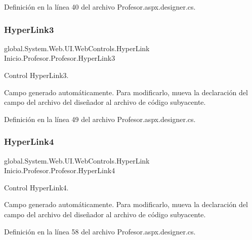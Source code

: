 Definición en la línea 40 del archivo Profesor.\+aspx.\+designer.\+cs.

\mbox{\label{classInicio_1_1Profesor_1_1Profesor_a741df29afdde160d779387af3d361b8f}} 
\subsubsection{\texorpdfstring{HyperLink3}{HyperLink3}}
{\footnotesize\ttfamily global.\+System.\+Web.\+U\+I.\+Web\+Controls.\+Hyper\+Link Inicio.\+Profesor.\+Profesor.\+Hyper\+Link3\hspace{0.3cm}{\ttfamily [protected]}}



Control Hyper\+Link3. 

Campo generado automáticamente. Para modificarlo, mueva la declaración del campo del archivo del diseñador al archivo de código subyacente. 

Definición en la línea 49 del archivo Profesor.\+aspx.\+designer.\+cs.

\mbox{\label{classInicio_1_1Profesor_1_1Profesor_a41defc3c5d27fcb0e5b001b0ff781fe3}} 
\subsubsection{\texorpdfstring{HyperLink4}{HyperLink4}}
{\footnotesize\ttfamily global.\+System.\+Web.\+U\+I.\+Web\+Controls.\+Hyper\+Link Inicio.\+Profesor.\+Profesor.\+Hyper\+Link4\hspace{0.3cm}{\ttfamily [protected]}}



Control Hyper\+Link4. 

Campo generado automáticamente. Para modificarlo, mueva la declaración del campo del archivo del diseñador al archivo de código subyacente. 

Definición en la línea 58 del archivo Profesor.\+aspx.\+designer.\+cs.

\mbox{\label{classInicio_1_1Profesor_1_1Profesor_af7b5f3cdfb5cac1fc80c5717283155f6}} 
